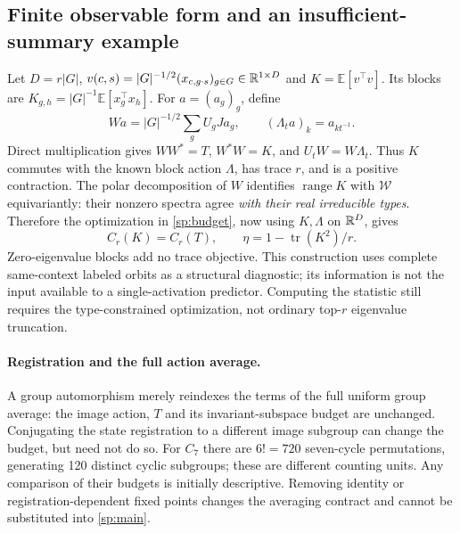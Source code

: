 \subsection{Finite observable form and an insufficient-summary example}
\label{sp:observable}
Let $D=r|G|$, $v(c,s)=|G|^{-1/2}(x_{c,g\cdot s})_{g\in G}\in\mathbb{R}^{1\times D}$ and $K=\mathbb E[v^\top v]$. Its blocks are $K_{g,h}=|G|^{-1}\mathbb E[x_g^\top x_h]$. For $a=(a_g)_g$, define
\[
 Wa=|G|^{-1/2}\sum_gU_gJa_g,\qquad (\Lambda_ta)_k=a_{kt^{-1}}.
\]
Direct multiplication gives $WW^*=T$, $W^*W=K$, and $U_tW=W\Lambda_t$. Thus $K$ commutes with the known block action $\Lambda$, has trace $r$, and is a positive contraction. The polar decomposition of $W$ identifies $\operatorname{range}K$ with $\mathcal W$ equivariantly: their nonzero spectra agree \emph{with their real irreducible types}. Therefore the optimization in \cref{sp:budget}, now using $K,\Lambda$ on $\mathbb{R}^D$, gives
\[
 C_r(K)=C_r(T),\qquad \eta=1-\operatorname{tr}(K^2)/r.
\]
Zero-eigenvalue blocks add no trace objective. This construction uses complete same-context labeled orbits as a structural diagnostic; its information is not the input available to a single-activation predictor. Computing the statistic still requires the type-constrained optimization, not ordinary top-$r$ eigenvalue truncation.

\paragraph{Registration and the full action average.}
A group automorphism merely reindexes the terms of the full uniform group average: the image action, $T$ and its invariant-subspace budget are unchanged. Conjugating the state registration to a different image subgroup can change the budget, but need not do so. For $C_7$ there are $6!=720$ seven-cycle permutations, generating 120 distinct cyclic subgroups; these are different counting units. Any comparison of their budgets is initially descriptive. Removing identity or registration-dependent fixed points changes the averaging contract and cannot be substituted into \cref{sp:main}.

